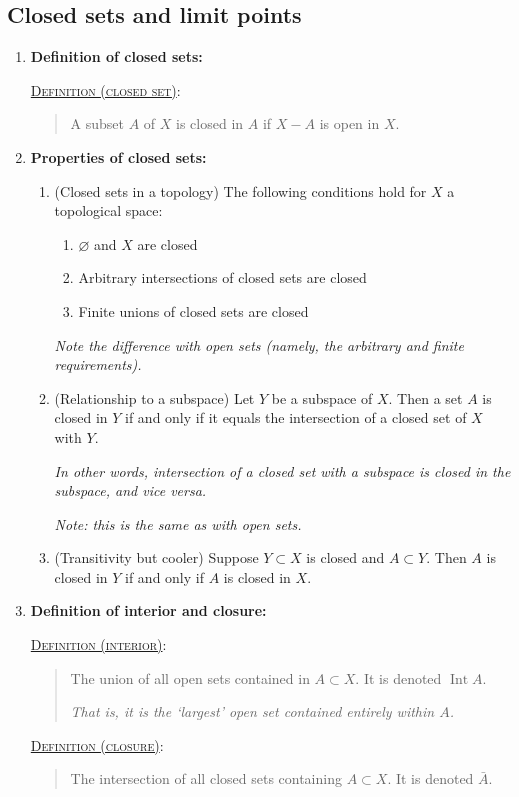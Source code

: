 \documentclass[letterpaper, 12pt]{article}
\newcommand{\defn}[2]{\textsc{\underline{Definition (#1)}:}\begin{quote} #2\end{quote}}
\let\emptyset\varnothing
\begin{document}
    \subsection{Closed sets and limit points}
        \begin{enumerate}[resume]
        \item \textbf{Definition of closed sets:} 

        \defn{closed set}{A subset $A$ of $X$ is closed in $A$ if $X-A$ is open in $X$.}
        \item \textbf{Properties of closed sets:}
        \begin{enumerate}
        \item (Closed sets in a topology) The following conditions hold for $X$ a topological space:
        \begin{enumerate}
        \item $\emptyset$ and $X$ are closed
        \item Arbitrary intersections of closed sets are closed
        \item Finite unions of closed sets are closed
        \end{enumerate}
        \textit{Note the difference with open sets (namely, the arbitrary and finite requirements).}

        \item (Relationship to a subspace) Let $Y$ be a subspace of $X$. Then a set $A$ is closed in $Y$ if and only if it equals the intersection of a closed set of $X$ with $Y$.

        \textit{In other words, intersection of a closed set with a subspace is closed in the subspace, and vice versa.}

        \textit{Note: this is the same as with open sets.}
        \item (Transitivity but cooler) Suppose $Y\subset X$ is closed and $A\subset Y$. Then $A$ is closed in $Y$ if and only if $A$ is closed in $X$.
        \end{enumerate}
        \item \textbf{Definition of interior and closure:}

        \defn{interior}{The union of all open sets contained in $A \subset X$. It is denoted $\operatorname{Int}A$.

        \textit{That is, it is the `largest' open set contained entirely within $A$.}}

        \defn{closure}{The intersection of all closed sets containing $A\subset X$. It is denoted $\bar{A}$.

}
\end{enumerate}
\end{document}
